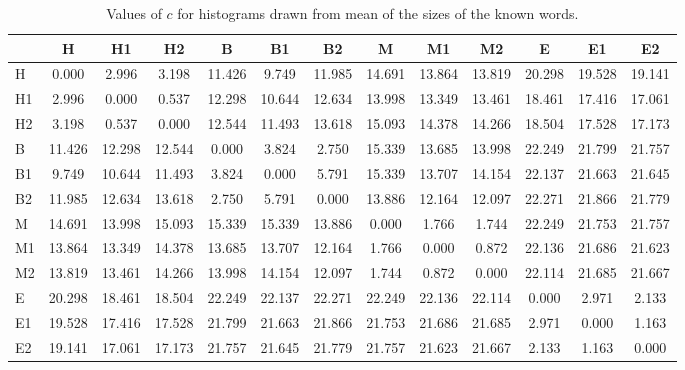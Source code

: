 \begin{table*}[h!]
\begin{center}
\begin{tabular}{| l | c | c | c | c | c | c | c | c | c | c | c | c |}\hline
 & H & H1 & H2 & B & B1 & B2 & M & M1 & M2 & E & E1 & E2 \\\hline
H & 0.000  & 2.996  & 3.198  & 11.426  & 9.749  & 11.985  & 14.691  & 13.864  & 13.819  & 20.298  & 19.528  & 19.141 \\\hline
H1 & 2.996  & 0.000  & 0.537  & 12.298  & 10.644  & 12.634  & 13.998  & 13.349  & 13.461  & 18.461  & 17.416  & 17.061 \\\hline
H2 & 3.198  & 0.537  & 0.000  & 12.544  & 11.493  & 13.618  & 15.093  & 14.378  & 14.266  & 18.504  & 17.528  & 17.173 \\\hline
B & 11.426  & 12.298  & 12.544  & 0.000  & 3.824  & 2.750  & 15.339  & 13.685  & 13.998  & 22.249  & 21.799  & 21.757 \\\hline
B1 & 9.749  & 10.644  & 11.493  & 3.824  & 0.000  & 5.791  & 15.339  & 13.707  & 14.154  & 22.137  & 21.663  & 21.645 \\\hline
B2 & 11.985  & 12.634  & 13.618  & 2.750  & 5.791  & 0.000  & 13.886  & 12.164  & 12.097  & 22.271  & 21.866  & 21.779 \\\hline
M & 14.691  & 13.998  & 15.093  & 15.339  & 15.339  & 13.886  & 0.000  & 1.766  & 1.744  & 22.249  & 21.753  & 21.757 \\\hline
M1 & 13.864  & 13.349  & 14.378  & 13.685  & 13.707  & 12.164  & 1.766  & 0.000  & 0.872  & 22.136  & 21.686  & 21.623 \\\hline
M2 & 13.819  & 13.461  & 14.266  & 13.998  & 14.154  & 12.097  & 1.744  & 0.872  & 0.000  & 22.114  & 21.685  & 21.667 \\\hline
E & 20.298  & 18.461  & 18.504  & 22.249  & 22.137  & 22.271  & 22.249  & 22.136  & 22.114  & 0.000  & 2.971  & 2.133 \\\hline
E1 & 19.528  & 17.416  & 17.528  & 21.799  & 21.663  & 21.866  & 21.753  & 21.686  & 21.685  & 2.971  & 0.000  & 1.163 \\\hline
E2 & 19.141  & 17.061  & 17.173  & 21.757  & 21.645  & 21.779  & 21.757  & 21.623  & 21.667  & 2.133  & 1.163  & 0.000 \\\hline
\end{tabular}
\caption{Values of $c$ for histograms drawn from mean of the sizes of the known words.}
\end{center}
\end{table*}